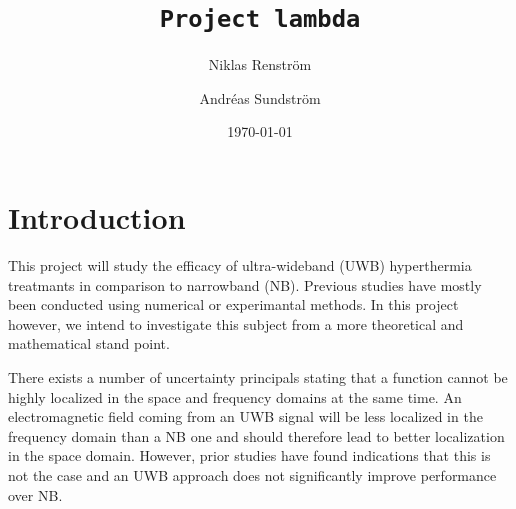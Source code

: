 \documentclass[11pt,a4paper, 
swedish,english %
]{article}
\begin{document}


%


\begin{titlepage}
\title{\tt Project lambda}
\author{Niklas Renström \and Andréas Sundström}
\date{\today}

\maketitle

\thispagestyle{empty} \pagestyle{empty} %

\begin{abstract} 


\end{abstract}
\newpage
\tableofcontents
\end{titlepage}

\setcounter{page}{1}


\section{Introduction}

This project will study the efficacy of ultra-wideband (UWB) hyperthermia treatmants in comparison to narrowband (NB). Previous studies have mostly been conducted using numerical or experimantal methods. In this project however, we intend to investigate this subject from a more theoretical and mathematical stand point. 

There exists a number of uncertainty  principals stating that a function cannot be highly localized in the space and frequency domains at the same time. An electromagnetic field coming from an UWB signal will be less localized in the frequency domain than a NB one and should therefore lead to better localization in the space domain. However, prior studies have found indications that this is not the case and an UWB approach does not significantly improve performance over NB.
\end{document}
